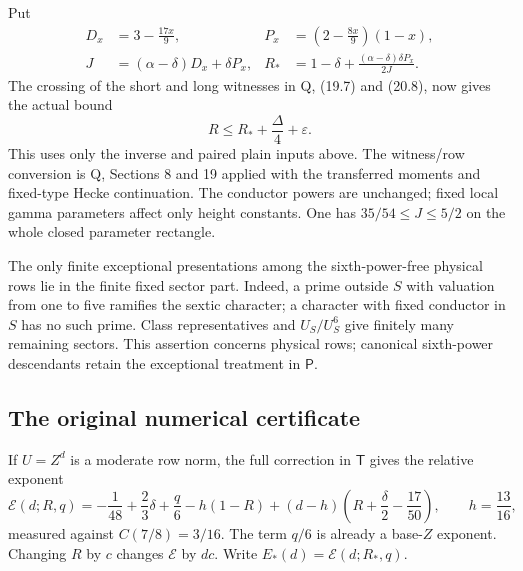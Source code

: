 \documentclass[11pt,a4paper]{article}
\theoremstyle{remark}\newtheorem{remark}[theorem]{Remark}
\newcommand{\eps}{\varepsilon}
\numberwithin{equation}{section}
\begin{document}
Put
\begin{align*}
 D_x&=3-\frac{17x}{9}, & P_x&=\left(2-\frac{8x}{9}\right)(1-x),\\
 J&=(\alpha-\delta)D_x+\delta P_x,
 &R_*&=1-\delta+
       \frac{(\alpha-\delta)\delta P_x}{2J}.
\end{align*}
The crossing of the short and long witnesses in Q, (19.7) and
(20.8), now gives the actual bound
\begin{equation}\label{eq-row-dynamic}
 R\le R_*+\frac{\Delta}{4}+\eps.
\end{equation}
This uses only the inverse and paired plain inputs above.
The witness/row conversion is Q, Sections 8 and 19 applied with
the transferred moments and fixed-type Hecke continuation.
The conductor powers are unchanged; fixed local gamma parameters
affect only height constants.
One has $35/54\le J\le5/2$ on the whole closed parameter rectangle.

The only finite exceptional presentations among the
sixth-power-free physical rows lie in the finite fixed sector
part. Indeed, a prime outside $S$ with valuation from one to
five ramifies the sextic character; a character with fixed
conductor in $S$ has no such prime. Class representatives
and $U_S/U_S^6$ give finitely many remaining sectors. This
assertion concerns physical rows; canonical sixth-power
descendants retain the exceptional treatment in $\mathsf P$.

\subsection{The original numerical certificate}

If $U=Z^d$ is a moderate row norm, the full correction in
$\mathsf T$ gives the relative exponent
\begin{equation}\label{eq-E-general}
 \mathcal E(d;R,q)=
 -\frac1{48}+\frac23\delta+\frac q6
       -h(1-R)
       +(d-h)\left(R+\frac\delta2-\frac{17}{50}\right),
 \qquad h=\frac{13}{16},
\end{equation}
measured against $C(7/8)=3/16$.
The term $q/6$ is already a base-$Z$ exponent.
Changing $R$ by $c$ changes $\mathcal E$ by $dc$.
Write $E_*(d)=\mathcal E(d;R_*,q)$.
\end{document}
